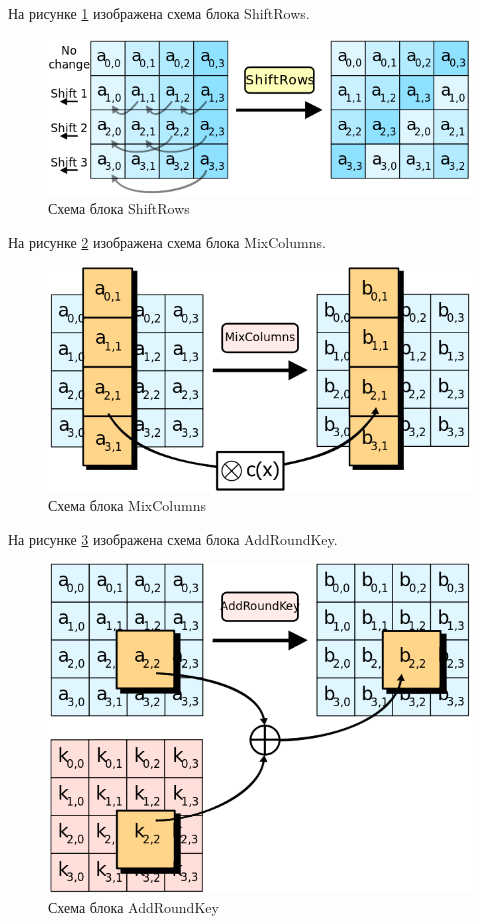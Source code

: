 На рисунке \ref{fig:des4} изображена схема блока ShiftRows.

\begin{figure}[H]
	\centering
	\includegraphics[width=0.7\linewidth]{img/aes_shiftr}
	\caption{Схема блока ShiftRows}
	\label{fig:des4}
\end{figure}

На рисунке \ref{fig:des5} изображена схема блока MixColumns.

\begin{figure}[H]
	\centering
	\includegraphics[width=0.7\linewidth]{img/aes_mixc}
	\caption{Схема блока MixColumns}
	\label{fig:des5}
\end{figure}

На рисунке \ref{fig:des6} изображена схема блока AddRoundKey.

\begin{figure}[H]
	\centering
	\includegraphics[width=0.7\linewidth]{img/aes_roundk}
	\caption{Схема блока AddRoundKey}
	\label{fig:des6}
\end{figure}


